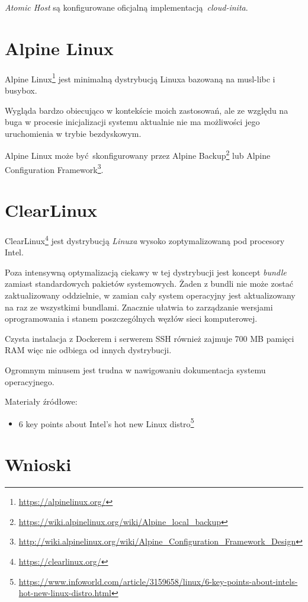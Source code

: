 \documentclass[a4paper,12pt,twoside,openany]{report}
\providecommand{\tightlist}{%
  \setlength{\itemsep}{0pt}\setlength{\parskip}{0pt}}
\DeclareRobustCommand{\href}[2]{#2\footnote{\url{#1}}}
\begin{document}
\emph{Atomic Host} są konfigurowane oficjalną
implementacją~\emph{cloud-inita}.

\hypertarget{alpine-linux}{%
\section{Alpine Linux}\label{alpine-linux}}

\href{https://alpinelinux.org/}{Alpine Linux} jest minimalną dystrybucją
Linuxa bazowaną na musl-libc i busybox.

Wygląda bardzo obiecująco w kontekście moich zastosowań, ale ze względu
na buga w procesie inicjalizacji systemu aktualnie nie ma możliwości
jego uruchomienia w trybie bezdyskowym.

Alpine Linux może być~skonfigurowany przez
\href{https://wiki.alpinelinux.org/wiki/Alpine_local_backup}{Alpine
Backup} lub
\href{http://wiki.alpinelinux.org/wiki/Alpine_Configuration_Framework_Design}{Alpine
Configuration Framework}.

\hypertarget{clearlinux}{%
\section{ClearLinux}\label{clearlinux}}

\href{https://clearlinux.org/}{ClearLinux} jest dystrybucją
\emph{Linuxa} wysoko zoptymalizowaną pod procesory Intel.

Poza intensywną optymalizacją ciekawy w tej dystrybucji jest koncept
\emph{bundle} zamiast standardowych pakietów systemowych. Żaden z bundli
nie może zostać zaktualizowany oddzielnie, w zamian cały system
operacyjny jest aktualizowany na raz ze wszystkimi bundlami. Znacznie
ułatwia to zarządzanie wersjami oprogramowania i stanem poszczególnych
węzłów sieci komputerowej.

Czysta instalacja z Dockerem i serwerem SSH również zajmuje 700 MB
pamięci RAM więc nie odbiega od innych dystrybucji.

Ogromnym minusem jest trudna w nawigowaniu dokumentacja systemu
operacyjnego.

Materiały źródłowe:

\begin{itemize}
\tightlist
\item
  \href{https://www.infoworld.com/article/3159658/linux/6-key-points-about-intels-hot-new-linux-distro.html}{6
  key points about Intel's hot new Linux distro}
\end{itemize}

\hypertarget{wnioski}{%
\section{Wnioski}\label{wnioski}}
\end{document}
